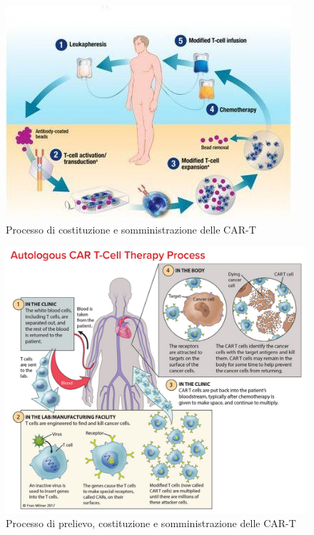 \begin{figure}[H]
    \begin{center}
    \includegraphics[width=0.58\columnwidth]{img/car-tprocess.jpeg}
    \end{center}
    \caption[Processo di costituzione e somministrazione delle CAR-T]{Processo di costituzione e somministrazione delle CAR-T
    \cite{img23}}

\end{figure}

\begin{figure}[H]
    \begin{center}
    \includegraphics[width=0.8\columnwidth]{img/CART-TherapyProcess.jpeg}
    \end{center}
    \caption[Processo di prelievo, costituzione e somministrazione delle CAR-T]{Processo di prelievo, costituzione e somministrazione delle CAR-T
    \cite{img24}}

\end{figure}

